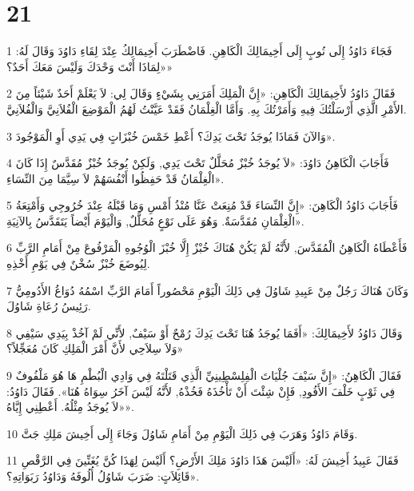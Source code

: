 \chapter{21}

\par 1 فَجَاءَ دَاوُدُ إِلَى نُوبٍ إِلَى أَخِيمَالِكَ الْكَاهِنِ. فَاضْطَرَبَ أَخِيمَالِكُ عِنْدَ لِقَاءِ دَاوُدَ وَقَالَ لَهُ: «لِمَاذَا أَنْتَ وَحْدَكَ وَلَيْسَ مَعَكَ أَحَدٌ؟»
\par 2 فَقَالَ دَاوُدُ لأَخِيمَالِكَ الْكَاهِنِ: «إِنَّ الْمَلِكَ أَمَرَنِي بِشَيْءٍ وَقَالَ لِي: لاَ يَعْلَمْ أَحَدٌ شَيْئاً مِنَ الأَمْرِ الَّذِي أَرْسَلْتُكَ فِيهِ وَأَمَرْتُكَ بِهِ. وَأَمَّا الْغِلْمَانُ فَقَدْ عَيَّنْتُ لَهُمُ الْمَوْضِعَ الْفُلاَنِيَّ وَالْفُلاَنِيَّ.
\par 3 وَالآنَ فَمَاذَا يُوجَدُ تَحْتَ يَدِكَ؟ أَعْطِ خَمْسَ خُبْزَاتٍ فِي يَدِي أَوِ الْمَوْجُودَ».
\par 4 فَأَجَابَ الْكَاهِنُ دَاوُدَ: «لاَ يُوجَدُ خُبْزٌ مُحَلَّلٌ تَحْتَ يَدِي, وَلَكِنْ يُوجَدُ خُبْزٌ مُقَدَّسٌ إِذَا كَانَ الْغِلْمَانُ قَدْ حَفِظُوا أَنْفُسَهُمْ لاَ سِيَّمَا مِنَ النِّسَاءِ».
\par 5 فَأَجَابَ دَاوُدُ الْكَاهِنَ: «إِنَّ النِّسَاءَ قَدْ مُنِعَتْ عَنَّا مُنْذُ أَمْسِ وَمَا قَبْلَهُ عِنْدَ خُرُوجِي وَأَمْتِعَةُ الْغِلْمَانِ مُقَدَّسَةٌ. وَهُوَ عَلَى نَوْعٍ مُحَلَّلٌ, وَالْيَوْمَ أَيْضاً يَتَقَدَّسُ بِالآنِيَةِ».
\par 6 فَأَعْطَاهُ الْكَاهِنُ الْمُقَدَّسَ, لأَنَّهُ لَمْ يَكُنْ هُنَاكَ خُبْزٌ إِلَّا خُبْزَ الْوُجُوهِ الْمَرْفُوعَ مِنْ أَمَامِ الرَّبِّ لِيُوضَعَ خُبْزٌ سُخْنٌ فِي يَوْمِ أَخْذِهِ.
\par 7 وَكَانَ هُنَاكَ رَجُلٌ مِنْ عَبِيدِ شَاوُلَ فِي ذَلِكَ الْيَوْمِ مَحْصُوراً أَمَامَ الرَّبِّ اسْمُهُ دُوَاغُ الأَدُومِيُّ رَئِيسُ رُعَاةِ شَاوُلَ.
\par 8 وَقَالَ دَاوُدُ لأَخِيمَالِكَ: «أَفَمَا يُوجَدُ هُنَا تَحْتَ يَدِكَ رُمْحٌ أَوْ سَيْفٌ, لأَنِّي لَمْ آخُذْ بِيَدِي سَيْفِي وَلاَ سِلاَحِي لأَنَّ أَمْرَ الْمَلِكِ كَانَ مُعَجِّلاً؟»
\par 9 فَقَالَ الْكَاهِنُ: «إِنَّ سَيْفَ جُلْيَاتَ الْفِلِسْطِينِيِّ الَّذِي قَتَلْتَهُ فِي وَادِي الْبُطْمِ هَا هُوَ مَلْفُوفٌ فِي ثَوْبٍ خَلْفَ الأَفُودِ, فَإِنْ شِئْتَ أَنْ تَأْخُذَهُ فَخُذْهُ, لأَنَّهُ لَيْسَ آخَرُ سِوَاهُ هُنَا». فَقَالَ دَاوُدُ: «لاَ يُوجَدُ مِثْلُهُ. أَعْطِنِي إِيَّاهُ».
\par 10 وَقَامَ دَاوُدُ وَهَرَبَ فِي ذَلِكَ الْيَوْمِ مِنْ أَمَامِ شَاوُلَ وَجَاءَ إِلَى أَخِيشَ مَلِكِ جَتَّ.
\par 11 فَقَالَ عَبِيدُ أَخِيشَ لَهُ: «أَلَيْسَ هَذَا دَاوُدَ مَلِكَ الأَرْضِ؟ أَلَيْسَ لِهَذَا كُنَّ يُغَنِّينَ فِي الرَّقْصِ قَائِلاَتٍ: ضَرَبَ شَاوُلُ أُلُوفَهُ وَدَاوُدُ رَبَوَاتِهِ؟».
